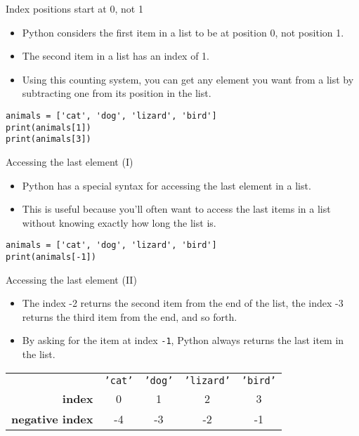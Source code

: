 \documentclass[aspectratio=169]{beamer}
\begin{document}
\begin{frame}[fragile]{Index positions start at 0, not 1}
    \begin{itemize}[label=--,itemsep=15pt]
        \item Python considers the first item in a list to be at position 0, not position 1.
        \item The second item in a list has an index of 1.
        \item Using this counting system, you can get any element you want from a list by subtracting one from its position in the list. 
    \end{itemize}
    \vspace{15pt}
    \begin{verbatim}
animals = ['cat', 'dog', 'lizard', 'bird']
print(animals[1])
print(animals[3])
    \end{verbatim}
\end{frame}


\begin{frame}[fragile]{Accessing the last element (I)}
    \begin{itemize}[label=--,itemsep=15pt]
        \item Python has a special syntax for accessing the last element in a list.
        \item This is useful because you’ll often want to access the last items in a list without knowing exactly how long the list is.
    \end{itemize}
    \vspace{15pt}
    \begin{verbatim}
animals = ['cat', 'dog', 'lizard', 'bird']
print(animals[-1])
    \end{verbatim}
\end{frame}


\begin{frame}[fragile]{Accessing the last element (II)}
    \begin{itemize}[label=--,itemsep=15pt]
        \item The index -2 returns the second item from the end of the list, the index -3 returns the third item from the end, and so forth.
        \item By asking for the item at index \texttt{-1}, Python always returns the last item in the list.
    \end{itemize}
    \vspace{15pt}
    \begin{table}
    \centering
        \begin{tabular}{rcccc}
                                    & \texttt{'cat'} & \texttt{'dog'} & \texttt{'lizard'} & \texttt{'bird'} \\
            \textbf{index}          & 0              & 1              & 2                 & 3               \\
            \textbf{negative index} & -4             & -3             & -2                & -1              \\
        \end{tabular}
    \end{table}   
\end{frame}
\end{document}
